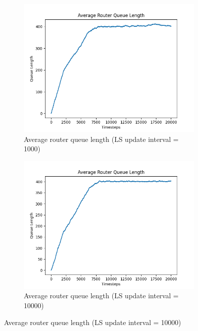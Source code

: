    \begin{figure}[H]\ContinuedFloat
        \centering
        \begin{subfigure}[t]{0.475\textwidth}
            \centering
            \includegraphics[width=\textwidth]{figs/appendix/average_ls=1000.png}
            \caption[]{Average router queue length (LS update interval = 1000)}
            \label{fig:avgq-1000}
        \end{subfigure}
        \hfill
        \begin{subfigure}[t]{0.475\textwidth}
            \centering
            \includegraphics[width=\textwidth]{figs/appendix/average_ls=10000.png}
            \caption[]{Average router queue length (LS update interval = 10000)}
            \label{fig:avgq-10000}
        \end{subfigure}
    \end{figure}
    
